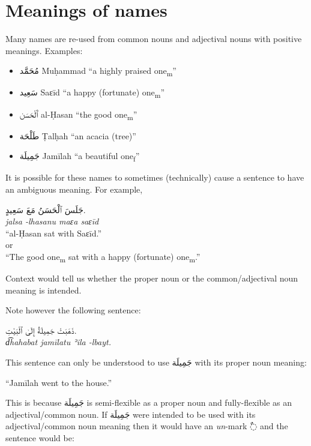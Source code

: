 \documentclass[
  10pt,
]{book}
\providecommand{\tightlist}{%
  \setlength{\itemsep}{0pt}\setlength{\parskip}{0pt}}
\begin{document}
\section{Meanings of names}\label{meanings-of-names}

Many names are re-used from common nouns and adjectival nouns with positive meanings. Examples:

\begin{itemize}
\tightlist
\item
  \foreignlanguage{arabic}{مُحَمَّد} Muḥammad \enquote{a highly praised one\textsubscript{m}}
\item
  \foreignlanguage{arabic}{سَعِيد} Saɛīd \enquote{a happy (fortunate) one\textsubscript{m}}
\item
  \foreignlanguage{arabic}{ٱَلْحَسَن} al-Ḥasan \enquote{the good one\textsubscript{m}}
\item
  \foreignlanguage{arabic}{طَلْحَة} Ṭalḥah \enquote{an acacia (tree)}
\item
  \foreignlanguage{arabic}{جَمِيلَة} Jamīlah \enquote{a beautiful one\textsubscript{f}}
\end{itemize}

It is possible for these names to sometimes (technically) cause a sentence to have an ambiguous meaning. For example,

\foreignlanguage{arabic}{جَلَسَ ٱلْحَسَنُ مَعَ سَعِيدٍ.}\\
\emph{jalsa -lhasanu maɛa saɛīd}\\
\enquote{al-Ḥasan sat with Saɛīd.}\\
or\\
\enquote{The good one\textsubscript{m} sat with a happy (fortunate) one\textsubscript{m}.}

Context would tell us whether the proper noun or the common/adjectival noun meaning is intended.

Note however the following sentence:

\foreignlanguage{arabic}{ذَهَبَتْ جَمِيلَةُ إِلَىٰ ٱلْبَيْتِ.}\\
\emph{d͡hahabat jamīlatu ʾila -lbayt.}

This sentence can only be understood to use \foreignlanguage{arabic}{جَمِيلَة} with its proper noun meaning:

\enquote{Jamīlah went to the house.}

This is because \foreignlanguage{arabic}{جَمِيلَة} is semi-flexible as a proper noun and fully-flexible as an adjectival/common noun. If \foreignlanguage{arabic}{جَمِيلَة} were intended to be used with its adjectival/common noun meaning then it would have an \emph{un}-mark \foreignlanguage{arabic}{◌ٌ} and the sentence would be:
\end{document}
